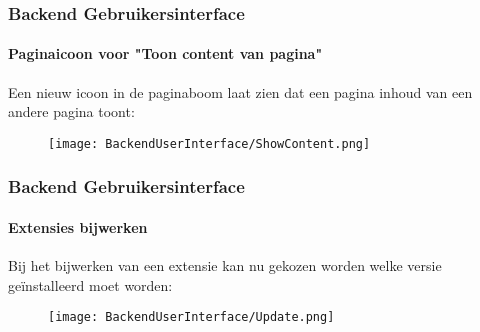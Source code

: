 \begin{frame}[fragile]
	\frametitle{Backend Gebruikersinterface}
	\framesubtitle{Paginaicoon voor "Toon content van pagina"}

	Een nieuw icoon in de paginaboom laat zien dat een pagina inhoud van een andere
	pagina toont:

	\begin{figure}
		\texttt{[image: BackendUserInterface/ShowContent.png]}
	\end{figure}

\end{frame}

\begin{frame}[fragile]
	\frametitle{Backend Gebruikersinterface}
	\framesubtitle{Extensies bijwerken}

	Bij het bijwerken van een extensie kan nu gekozen worden welke versie
	geïnstalleerd moet worden:

	\begin{figure}
		\texttt{[image: BackendUserInterface/Update.png]}
	\end{figure}

\end{frame}

